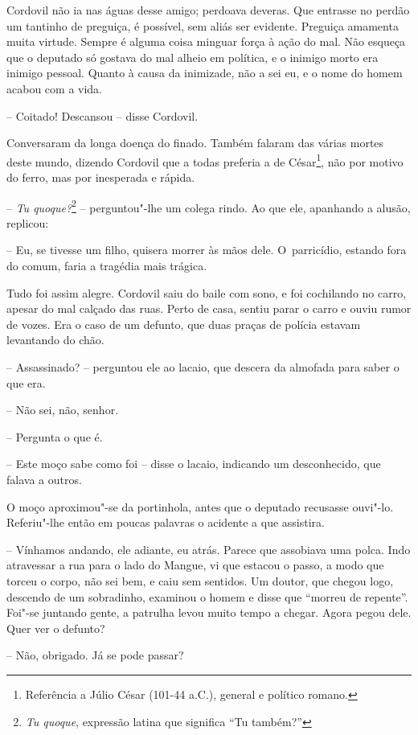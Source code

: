 Cordovil não ia nas águas desse amigo; perdoava deveras. Que entrasse no
perdão um tantinho de preguiça, é possível, sem aliás ser evidente.
Preguiça amamenta muita virtude. Sempre é alguma coisa minguar força à
ação do mal. Não esqueça que o deputado só gostava do mal alheio em
política, e o inimigo morto era inimigo pessoal. Quanto à causa da
inimizade, não a sei eu, e o nome do homem acabou com a vida.

-- Coitado! Descansou -- disse Cordovil.

Conversaram da longa doença do finado. Também falaram das várias mortes
deste mundo, dizendo Cordovil que a todas preferia a de César\footnote{Referência
  a Júlio César (101-44 a.C.), general e político romano.}, não por
motivo do ferro, mas por inesperada e rápida.

-- \emph{Tu quoque?}\footnote{\emph{Tu quoque}, expressão latina que
  significa ``Tu também?''} -- perguntou"-lhe um colega rindo. Ao que
ele, apanhando a alusão, replicou:

-- Eu, se tivesse um filho, quisera morrer às mãos dele. O~parricídio,
estando fora do comum, faria a tragédia mais trágica.

Tudo foi assim alegre. Cordovil saiu do baile com sono, e foi cochilando
no carro, apesar do mal calçado das ruas. Perto de casa, sentiu parar o
carro e ouviu rumor de vozes. Era o caso de um defunto, que duas praças
de polícia estavam levantando do chão.

-- Assassinado? -- perguntou ele ao lacaio, que descera da almofada para
saber o que era.

-- Não sei, não, senhor.

-- Pergunta o que é.

-- Este moço sabe como foi -- disse o lacaio, indicando um desconhecido,
que falava a outros.

O moço aproximou"-se da portinhola, antes que o deputado recusasse
ouvi"-lo. Referiu"-lhe então em poucas palavras o acidente a que
assistira.

-- Vínhamos andando, ele adiante, eu atrás. Parece que assobiava uma
polca. Indo atravessar a rua para o lado do Mangue, vi que estacou o
passo, a modo que torceu o corpo, não sei bem, e caiu sem sentidos. Um
doutor, que chegou logo, descendo de um sobradinho, examinou o homem e
disse que ``morreu de repente''. Foi"-se juntando gente, a patrulha levou
muito tempo a chegar. Agora pegou dele. Quer ver o defunto?

-- Não, obrigado. Já se pode passar?

